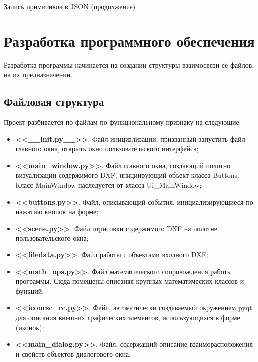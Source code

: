 \begin{algorithm}[H]
	\SetAlgoLined

	\caption{Запись примитивов в JSON (продолжение)}
	\label{alg:json1}
\end{algorithm}

\newpage

\section{Разработка программного обеспечения}
Разработка программы начинается на создании структуры взаимосвязи её файлов, на их предназначении.

\subsection{Файловая структура}

Проект разбивается по файлам по функциональному признаку на следующие:
\begin{itemize}
	\item \textbf{<<\_\_init.py\_\_>>}. Файл инициализации, призванный запустить файл главного окна, открыть окно пользовательского интерфейса;
	\item \textbf{<<main\_window.py>>}. Файл главного окна, создающий полотно визуализации содержимого DXF, инициирующий объект класса Buttons. Класс MainWindow наследуется от класса Ui\_MainWindow;
	\item \textbf{<<buttons.py>>}. Файл, описывающий события, инициализирующиеся по нажатию кнопок на форме; 
	\item \textbf{<<scene.py>>}. Файл отрисовки содержимого DXF на полотне пользовательского окна;
	\item \textbf{<<filedata.py>>}. Файл работы с объектами входного DXF; 
	\item \textbf{<<math\_ops.py>>}. Файл математического сопровождения работы программы. Сюда помещены описания крупных математических классов и функций;
	\item \textbf{<<iconrsc\_rc.py>>}. Файл, автоматически создаваемый окружением pyqt для описания внешних графических элементов, использующихся в форме (иконок);
	\item \textbf{<<main\_dialog.py>>}. Файл, содержащий описание взаиморасположения и свойств объектов диалогового окна.
\end{itemize}


